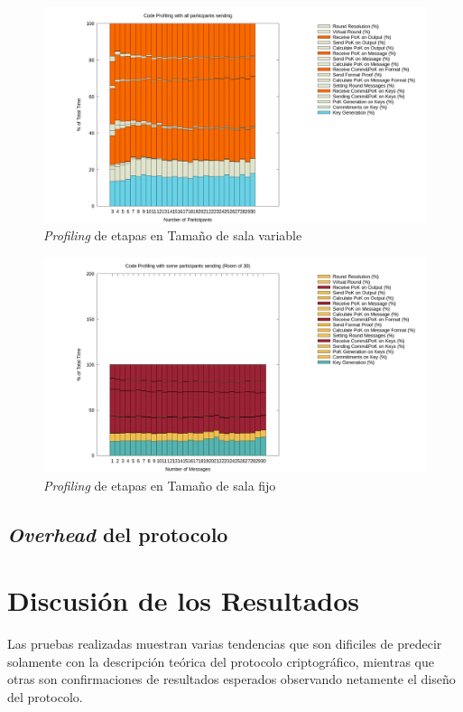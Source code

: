 \begin{figure}[h]
  \centering
    \includegraphics[scale=0.3]{logs/logs_all/profile.png}
  \caption{\emph{Profiling} de etapas en Tamaño de sala variable}
\end{figure}

\begin{figure}[h]
  \centering
    \includegraphics[scale=0.3]{logs/logs_partial_30/profile.png}
  \caption{\emph{Profiling} de etapas en Tamaño de sala fijo}
\end{figure}

\subsection{\emph{Overhead} del protocolo}

\section{Discusión de los Resultados}

Las pruebas realizadas muestran varias tendencias que son dificiles de predecir 
solamente con la descripción teórica del protocolo criptográfico, mientras que otras 
son confirmaciones de resultados esperados observando netamente el diseño del 
protocolo.

